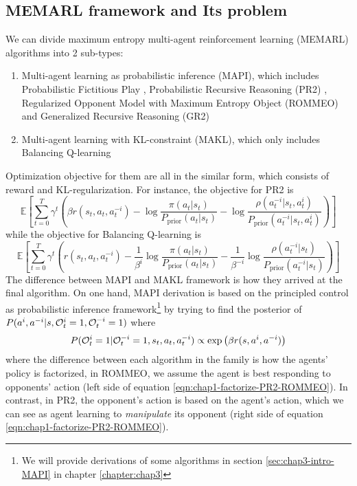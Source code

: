 \subsection{MEMARL framework and Its problem}
\label{sec:chap1-MEMARL-And-Problem}
We can divide maximum entropy multi-agent reinforcement learning (MEMARL) algorithms into 2 sub-types: 
\begin{enumerate}
    \item Multi-agent learning as probabilistic inference (MAPI), which includes Probabilistic Fictitious Play \cite{rezek2005unifying}, Probabilistic Recursive Reasoning (PR2) \cite{wen2019probabilistic} , Regularized Opponent Model with Maximum Entropy Object (ROMMEO) \cite{tian2019regularized} and Generalized Recursive Reasoning (GR2) \cite{wen2019multi}
    \item Multi-agent learning with KL-constraint (MAKL), which only includes Balancing Q-learning \cite{grau2018balancing}
\end{enumerate}
Optimization objective for them are all in the similar form, which consists of reward and KL-regularization. For instance, the objective for PR2 is 
\begin{equation}
    \mathbb{E}\left[ \sum^T_{t=0} \gamma^t \left(\beta r(s_t, a_t, a^{-i}_t) - \log\frac{\pi(a_t|s_t)}{P_{\operatorname{prior}}(a_t|s_t)} -\log \frac{\rho(a^{-i}_t|s_t, a^i_t)}{P_{\operatorname{prior}}(a^{-i}_t|s_t, a^i_t)} \right) \right]
\end{equation}
while the objective for Balancing Q-learning is 
\begin{equation}
    \mathbb{E}\left[ \sum^T_{t=0} \gamma^t \left(r(s_t, a_t, a^{-i}_t) - \frac{1}{\beta^i} \log\frac{\pi(a_t|s_t)}{P_{\operatorname{prior}}(a_t|s_t)} - \frac{1}{\beta^{-i}}\log \frac{\rho(a^{-i}_t|s_t)}{P_{\operatorname{prior}}(a^{-i}_t|s_t)} \right) \right]
\end{equation}
The difference between MAPI and MAKL framework is how they arrived at the final algorithm. On one hand, MAPI derivation is based on the principled control as probabilistic inference framework\footnote{We will provide derivations of some algorithms in section \ref{sec:chap3-intro-MAPI} in chapter \ref{chapter:chap3}} by trying to find the posterior of $P(a^i, a^{-i} | s, \mathcal{O}^i_t = 1, \mathcal{O}^{-i}_t = 1)$ where
\begin{equation}
    P(\mathcal{O}^i_t = 1 | \mathcal{O}^{-i}_t = 1, s_t, a_t, a^{-i}_t) \propto \exp\left( \beta r(s, a^i, a^{-i}) \right)
\end{equation}
where the difference between each algorithm in the family is how the agents' policy is factorized, in ROMMEO, we assume the agent is best responding to opponents' action (left side of equation \ref{eqn:chap1-factorize-PR2-ROMMEO}). In contrast, in PR2, the opponent's action is based on the agent's action, which we can see as agent learning to \textit{manipulate} its opponent (right side of equation \ref{eqn:chap1-factorize-PR2-ROMMEO}).
